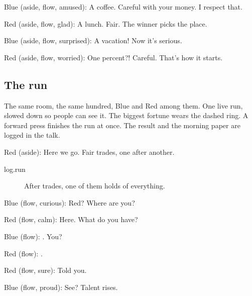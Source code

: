 Blue (aside, flow, amused): A coffee. Careful with your money.
I respect that.

Red (aside, flow, glad): A lunch.
Fair.
The winner picks the place.

Blue (aside, flow, surprised): A vacation! Now it's serious.

Red (aside, flow, worried): One percent?!
Careful.
That's how it starts.

\subsection{The run}\label{act:run}

\label{run}

The same room, the same hundred, Blue and Red among them. One live run,
slowed down so people can see it. The biggest fortune wears the dashed ring.
A forward press finishes the run at once. The result and the morning paper
are logged in the talk.


Red (aside): Here we go.
Fair trades, one after another.

\run

\begin{description}
  \item[log.run] After  trades, one of them holds  of everything.
\end{description}


Blue (flow, curious): Red? Where are you?

Red (flow, calm): Here. What do you have?

Blue (flow): . You?

Red (flow): .

Red (flow, sure): Told you.


Blue (flow, proud): See? Talent rises.

